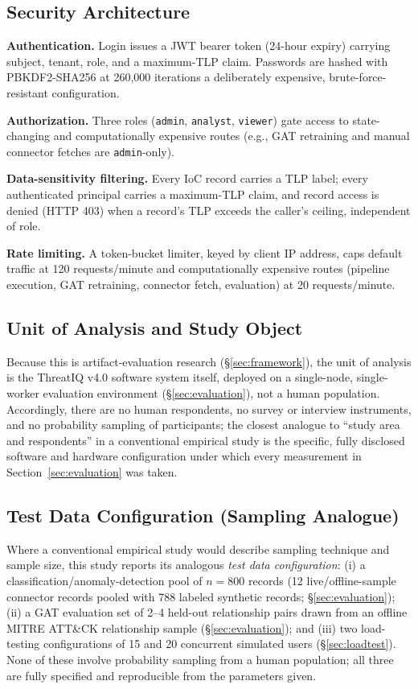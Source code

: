 \documentclass[conference]{IEEEtran}
\begin{document}
\subsection{Security Architecture}
\label{sec:security}
\textbf{Authentication.} Login issues a JWT \cite{rfc7519} bearer token (24-hour expiry) carrying subject, tenant, role, and a maximum-TLP claim. Passwords are hashed with PBKDF2-SHA256 \cite{rfc8018} at 260{,}000 iterations \textemdash{} a deliberately expensive, brute-force-resistant configuration.

\textbf{Authorization.} Three roles (\texttt{admin}, \texttt{analyst}, \texttt{viewer}) gate access to state-changing and computationally expensive routes (e.g., GAT retraining and manual connector fetches are \texttt{admin}-only).

\textbf{Data-sensitivity filtering.} Every IoC record carries a TLP label; every authenticated principal carries a maximum-TLP claim, and record access is denied (HTTP 403) when a record's TLP exceeds the caller's ceiling, independent of role.

\textbf{Rate limiting.} A token-bucket limiter, keyed by client IP address, caps default traffic at 120 requests/minute and computationally expensive routes (pipeline execution, GAT retraining, connector fetch, evaluation) at 20 requests/minute.

\subsection{Unit of Analysis and Study Object}
Because this is artifact-evaluation research (\S\ref{sec:framework}), the unit of analysis is the ThreatIQ v4.0 software system itself, deployed on a single-node, single-worker evaluation environment (\S\ref{sec:evaluation}), not a human population. Accordingly, there are no human respondents, no survey or interview instruments, and no probability sampling of participants; the closest analogue to ``study area and respondents'' in a conventional empirical study is the specific, fully disclosed software and hardware configuration under which every measurement in Section~\ref{sec:evaluation} was taken.

\subsection{Test Data Configuration (Sampling Analogue)}
\label{sec:sampling}
Where a conventional empirical study would describe sampling technique and sample size, this study reports its analogous \emph{test data configuration}: (i) a classification/anomaly-detection pool of $n=800$ records (12 live/offline-sample connector records pooled with 788 labeled synthetic records; \S\ref{sec:evaluation}); (ii) a GAT evaluation set of 2--4 held-out relationship pairs drawn from an offline MITRE ATT\&CK relationship sample (\S\ref{sec:evaluation}); and (iii) two load-testing configurations of 15 and 20 concurrent simulated users (\S\ref{sec:loadtest}). None of these involve probability sampling from a human population; all three are fully specified and reproducible from the parameters given.
\end{document}
